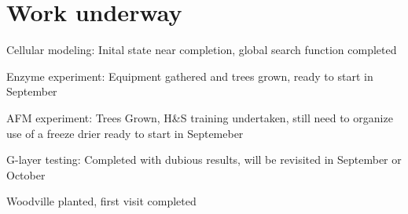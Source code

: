\section{Work underway}
Cellular modeling:
Inital state near completion, global search function completed

Enzyme experiment: 
Equipment gathered and trees grown, ready to start in September

AFM experiment:
Trees Grown, H&S training undertaken, still need to organize use of a freeze drier
ready to start in Septemeber

G-layer testing:
Completed with dubious results, will be revisited in September or October

Woodville planted, first visit completed

  
  
  